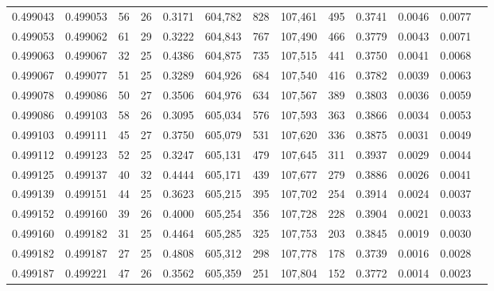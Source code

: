 \begin{tabular}{rrrrrrrrrrrrr}
0.499043 & 0.499053 &  56 &  26 &                                     0.3171 & 604,782 &     828 & 107,461 &     495 & 0.3741 & 0.0046 & 0.0077 \\
0.499053 & 0.499062 &  61 &  29 &                                     0.3222 & 604,843 &     767 & 107,490 &     466 & 0.3779 & 0.0043 & 0.0071 \\
0.499063 & 0.499067 &  32 &  25 &                                     0.4386 & 604,875 &     735 & 107,515 &     441 & 0.3750 & 0.0041 & 0.0068 \\
0.499067 & 0.499077 &  51 &  25 &                                     0.3289 & 604,926 &     684 & 107,540 &     416 & 0.3782 & 0.0039 & 0.0063 \\
0.499078 & 0.499086 &  50 &  27 &                                     0.3506 & 604,976 &     634 & 107,567 &     389 & 0.3803 & 0.0036 & 0.0059 \\
0.499086 & 0.499103 &  58 &  26 &                                     0.3095 & 605,034 &     576 & 107,593 &     363 & 0.3866 & 0.0034 & 0.0053 \\
0.499103 & 0.499111 &  45 &  27 &                                     0.3750 & 605,079 &     531 & 107,620 &     336 & 0.3875 & 0.0031 & 0.0049 \\
0.499112 & 0.499123 &  52 &  25 &                                     0.3247 & 605,131 &     479 & 107,645 &     311 & 0.3937 & 0.0029 & 0.0044 \\
0.499125 & 0.499137 &  40 &  32 &                                     0.4444 & 605,171 &     439 & 107,677 &     279 & 0.3886 & 0.0026 & 0.0041 \\
0.499139 & 0.499151 &  44 &  25 &                                     0.3623 & 605,215 &     395 & 107,702 &     254 & 0.3914 & 0.0024 & 0.0037 \\
0.499152 & 0.499160 &  39 &  26 &                                     0.4000 & 605,254 &     356 & 107,728 &     228 & 0.3904 & 0.0021 & 0.0033 \\
0.499160 & 0.499182 &  31 &  25 &                                     0.4464 & 605,285 &     325 & 107,753 &     203 & 0.3845 & 0.0019 & 0.0030 \\
0.499182 & 0.499187 &  27 &  25 &                                     0.4808 & 605,312 &     298 & 107,778 &     178 & 0.3739 & 0.0016 & 0.0028 \\
0.499187 & 0.499221 &  47 &  26 &                                     0.3562 & 605,359 &     251 & 107,804 &     152 & 0.3772 & 0.0014 & 0.0023 \\

\end{tabular}

